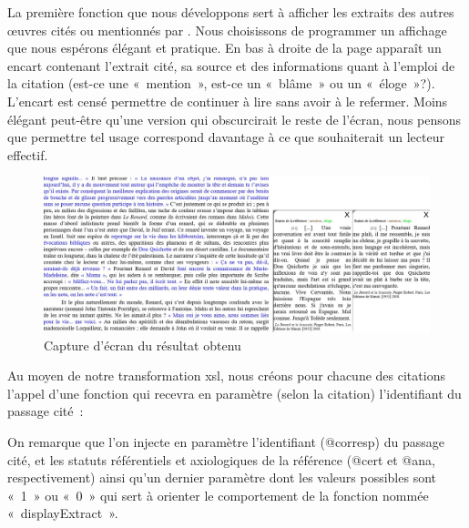 \documentclass[12pt, a4paper]{article}
\begin{document}
La première fonction que nous développons sert à afficher les extraits des autres œuvres cités ou mentionnés par \robbe. Nous choisissons de programmer un affichage que nous espérons élégant et pratique. En bas à droite de la page apparaît un encart contenant l'extrait cité, sa source et des informations quant à l'emploi de la citation (est-ce une «~mention~», est-ce un «~blâme~» ou un «~éloge~»?). L'encart est censé permettre de continuer à lire \punr{} sans avoir à le refermer. Moins élégant peut-être qu'une version qui obscurcirait le reste de l'écran, nous pensons que permettre tel usage correspond davantage à ce que souhaiterait un lecteur effectif.
\begin{figure}[H]
    \centering
    \includegraphics[scale=0.3]{img/screen_quote_result.jpg}
    \caption{Capture d'écran du résultat obtenu}
    \label{fig:quote}
\end{figure}


Au moyen de notre transformation xsl, nous créons pour chacune des citations l'appel d'une fonction qui recevra en paramètre (selon la citation) l'identifiant du passage cité~:


On remarque que l'on injecte en paramètre l'identifiant (@corresp) du passage cité, et les statuts référentiels et axiologiques de la référence (@cert et @ana, respectivement) ainsi qu'un dernier paramètre dont les valeurs possibles sont «~1~» ou «~0~» qui sert à orienter le comportement de la fonction nommée «~displayExtract~».
\end{document}
